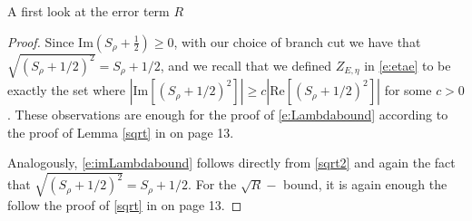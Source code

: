 \documentclass[11pt, a4paper, oneside]{book}
\numberwithin{equation}{chapter}
\begin{document}
\begin{section}{A first look at the error term \texorpdfstring{$R$}{R} }
\begin{proof}
Since $\mathrm{Im}(S_{\rho} + \frac{1}{2}) \geq 0$, with our choice of branch cut we have that $\sqrt{(S_{\rho} +1/2)^2} = S_{\rho}+1/2$, and we recall that we defined $Z_{E, \eta}$ in \eqref{e:etae} to be exactly the set where $\left | \mathrm{Im} \left [(S_{\rho} + 1/2)^2 \right ] \right | \geq c \left |\mathrm{Re} \left [(S_{\rho} + 1/2)^2 \right ] \right |$ for some $c>0$. These observations are enough for the proof of \eqref{e:Lambdabound} according to the proof of Lemma \ref{sqrt} in \cite{cacciapuoti2015bounds} on page 13.

Analogously, \eqref{e:imLambdabound} follows directly from \eqref{sqrt2} and again the fact that $\sqrt{(S_{\rho} +1/2)^2} = S_{\rho}+1/2$. For the $\sqrt{R}-$ bound, it is again enough the follow the proof of \ref{sqrt} in \cite{cacciapuoti2015bounds} on page 13.


\end{proof}
\end{section}
\end{document}

